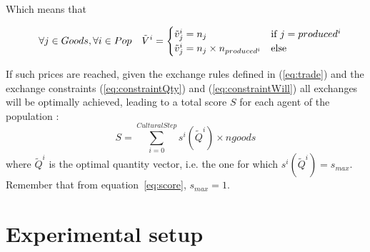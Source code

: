 \documentclass{wscpaperproc}
\begin{document}
Which means that 

\begin{equation}
	\quad \forall j \in Goods, \forall i \in Pop \quad \tilde{V}^i = 
	\begin{cases}
		\tilde{v}^i_j = n_j & \text{if $ j=produced^i$}\\
		 \tilde{v}^i_j = n_j \times n_{produced^i} & \text{else}
	\end{cases}\label{eq:optimum}
\end{equation}


If such prices are reached, given the exchange rules defined in (\ref{eq:trade}) and the exchange constraints (\ref{eq:constraintQty}) and (\ref{eq:constraintWill}) all exchanges will be optimally achieved, leading to a total score $S$ for each agent of the population : 
$$ S = \sum_{i=0}^{CulturalStep}  s^i(\tilde{Q}^i) \times ngoods $$ 
where $\tilde{Q}^i$ is the optimal quantity vector, i.e. the one for which $s^i(\tilde{Q}^i) = s_{max}$. Remember that from equation~\ref{eq:score}, $s_{max}=1$.

\section{Experimental setup}
%
\end{document}

